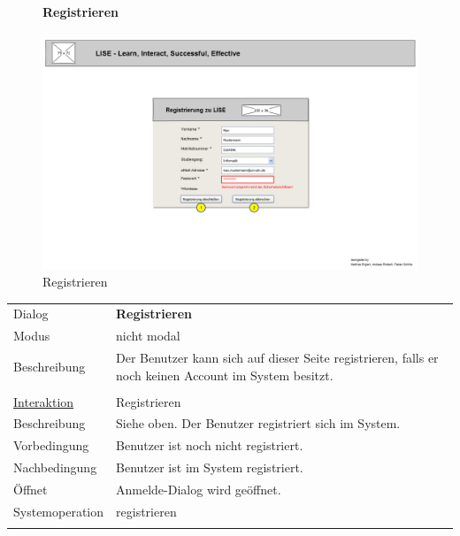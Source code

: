 \documentclass[12pt,a4paper]{article}
\begin{document}
{\begin{figure}[H]
	\paragraph{Registrieren}
	\includegraphics[width=\textwidth]{Bilder/Mockups/GUI/Registrierung.png}
	\caption{Registrieren}
	\label{GuiRegistrieren}
\end{figure}
\begin{tabular}{l p{12cm}}
	Dialog 	 & \textbf{Registrieren} \\ 
	Modus & nicht modal\\ 
	Beschreibung   	 & Der Benutzer kann sich auf dieser Seite registrieren, falls er noch keinen Account im System besitzt. \\\\
	
	\underline{Interaktion} 	 & Registrieren\\ 
	Beschreibung   	 & Siehe oben. Der Benutzer registriert sich im System.\\
	Vorbedingung	& Benutzer ist noch nicht registriert.\\
	Nachbedingung	& Benutzer ist im System registriert. \\
	Öffnet			& Anmelde-Dialog wird geöffnet.\\
	Systemoperation & registrieren\\\\
	
\end{tabular}\\\\

\begin{figure}[H]
	\centering

\end{figure}}
\end{document}
